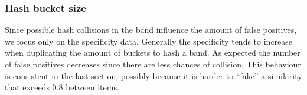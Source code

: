 \subsubsection{Hash bucket size}
Since possible hash collisions in the band influence the amount of false positives, we focus only on the specificity data. Generally the specificity tends to increase when duplicating the amount of buckets to hash a band. As expected the number of false positives decreases since there are less chances of collision. This behaviour is consistent in the last section, possibly because it is harder to ``fake'' a similarity that exceeds $0.8$ between items.



